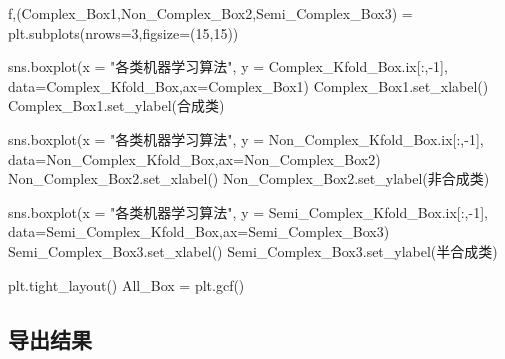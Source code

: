 \documentclass[
]{article}
\newenvironment{Shaded}{}{}
\newcommand{\DecValTok}[1]{\textcolor[rgb]{0.25,0.63,0.44}{#1}}
\newcommand{\NormalTok}[1]{#1}
\newcommand{\OperatorTok}[1]{\textcolor[rgb]{0.40,0.40,0.40}{#1}}
\newcommand{\StringTok}[1]{\textcolor[rgb]{0.25,0.44,0.63}{#1}}
\begin{document}
\begin{Shaded}
\begin{Highlighting}[]
\NormalTok{f,(Complex\_Box1,Non\_Complex\_Box2,Semi\_Complex\_Box3) }\OperatorTok{=}\NormalTok{ plt.subplots(nrows}\OperatorTok{=}\DecValTok{3}\NormalTok{,figsize}\OperatorTok{=}\NormalTok{(}\DecValTok{15}\NormalTok{,}\DecValTok{15}\NormalTok{))}

\NormalTok{sns.boxplot(x }\OperatorTok{=} \StringTok{"各类机器学习算法"}\NormalTok{, y }\OperatorTok{=}\NormalTok{ Complex\_Kfold\_Box.ix[:,}\OperatorTok{{-}}\DecValTok{1}\NormalTok{], }
\NormalTok{            data}\OperatorTok{=}\NormalTok{Complex\_Kfold\_Box,ax}\OperatorTok{=}\NormalTok{Complex\_Box1)}
\NormalTok{Complex\_Box1.set\_xlabel(}\StringTok{\textquotesingle{}\textquotesingle{}}\NormalTok{)}
\NormalTok{Complex\_Box1.set\_ylabel(}\StringTok{\textquotesingle{}合成类\textquotesingle{}}\NormalTok{)}

\NormalTok{sns.boxplot(x }\OperatorTok{=} \StringTok{"各类机器学习算法"}\NormalTok{, y }\OperatorTok{=}\NormalTok{ Non\_Complex\_Kfold\_Box.ix[:,}\OperatorTok{{-}}\DecValTok{1}\NormalTok{], }
\NormalTok{            data}\OperatorTok{=}\NormalTok{Non\_Complex\_Kfold\_Box,ax}\OperatorTok{=}\NormalTok{Non\_Complex\_Box2)}
\NormalTok{Non\_Complex\_Box2.set\_xlabel(}\StringTok{\textquotesingle{}\textquotesingle{}}\NormalTok{)}
\NormalTok{Non\_Complex\_Box2.set\_ylabel(}\StringTok{\textquotesingle{}非合成类\textquotesingle{}}\NormalTok{)}

\NormalTok{sns.boxplot(x }\OperatorTok{=} \StringTok{"各类机器学习算法"}\NormalTok{, y }\OperatorTok{=}\NormalTok{ Semi\_Complex\_Kfold\_Box.ix[:,}\OperatorTok{{-}}\DecValTok{1}\NormalTok{], }
\NormalTok{            data}\OperatorTok{=}\NormalTok{Semi\_Complex\_Kfold\_Box,ax}\OperatorTok{=}\NormalTok{Semi\_Complex\_Box3)}
\NormalTok{Semi\_Complex\_Box3.set\_xlabel(}\StringTok{\textquotesingle{}\textquotesingle{}}\NormalTok{)}
\NormalTok{Semi\_Complex\_Box3.set\_ylabel(}\StringTok{\textquotesingle{}半合成类\textquotesingle{}}\NormalTok{)}

\NormalTok{plt.tight\_layout()}
\NormalTok{All\_Box }\OperatorTok{=}\NormalTok{ plt.gcf()}
\end{Highlighting}
\end{Shaded}

\hypertarget{header-n345}{%
\subsection{导出结果}\label{header-n345}}
\end{document}
